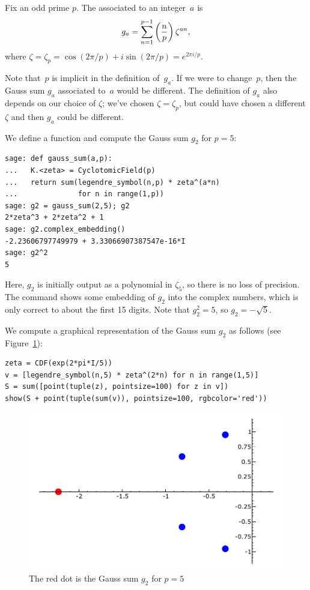 \begin{definition}
Fix an odd prime $p$.  The  associated to an integer~$a$ is
$$
g_a = \sum_{n=1}^{p-1} \left(\frac{n}{p}\right) \zeta^{an},
$$
where $\zeta=\zeta_p = \cos(2\pi{} /p) + i \sin(2\pi{}/p) = e^{2\pi i/p}$.
\end{definition}
Note that~$p$ is implicit in the definition of~$g_a$.  If we were to
change~$p$, then the Gauss sum $g_a$ associated to~$a$ would be
different.  The definition of $g_a$ also depends on our choice
of $\zeta$; we've chosen $\zeta=\zeta_p$, but could have chosen
a different $\zeta$ and then $g_a$ could be different.
\begin{sg}
We define a  function and compute
the Gauss sum $g_2$ for $p=5$:
\begin{verbatim}
sage: def gauss_sum(a,p):
...   K.<zeta> = CyclotomicField(p)
...   return sum(legendre_symbol(n,p) * zeta^(a*n)
...              for n in range(1,p))
sage: g2 = gauss_sum(2,5); g2
2*zeta^3 + 2*zeta^2 + 1
sage: g2.complex_embedding()
-2.23606797749979 + 3.33066907387547e-16*I
sage: g2^2
5
\end{verbatim}%
Here, $g_2$ is initially output as a polynomial in $\zeta_5$,
so there is no loss of precision.  The 
command shows some embedding of $g_2$ into the complex numbers,
which is only correct to about the first 15 digits.  Note
that $g_2^2 = 5$, so $g_2 = -\sqrt{5}$.

We compute a graphical representation of the Gauss sum $g_2$
as follows (see Figure~\ref{fig:gauss_sum}):
\begin{verbatim}
zeta = CDF(exp(2*pi*I/5))
v = [legendre_symbol(n,5) * zeta^(2*n) for n in range(1,5)]
S = sum([point(tuple(z), pointsize=100) for z in v])
show(S + point(tuple(sum(v)), pointsize=100, rgbcolor='red'))
\end{verbatim}%
\end{sg}

\begin{figure}
\includegraphics[width=\textwidth]{graphics/gauss_sum}
\caption{The red dot is the Gauss sum $g_2$ for $p=5$\label{fig:gauss_sum}}
\end{figure}

